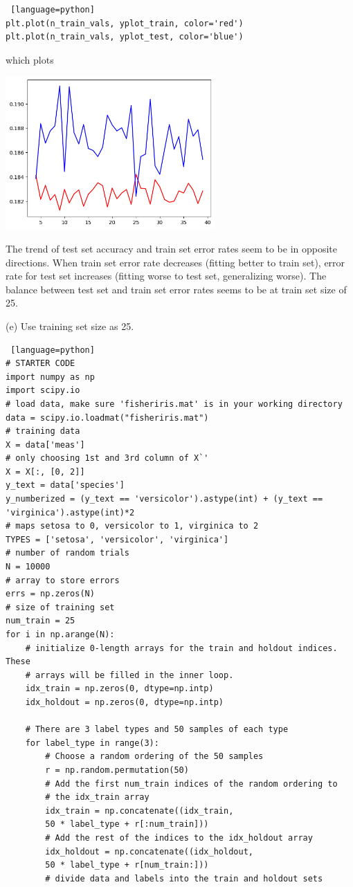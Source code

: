 \documentclass[a4paper, 12pt]{article}
\begin{document}
\begin{solution}
\begin{lstlisting} [language=python]
plt.plot(n_train_vals, yplot_train, color='red')
plt.plot(n_train_vals, yplot_test, color='blue')
\end{lstlisting} 
which plots 
\begin{center}
    \includegraphics[width=8cm]{./figures/3.3.png}
\end{center}
The trend of test set accuracy and train set error rates seem to be in opposite directions. When train set error rate decreases (fitting better to train set), error rate for test set increases (fitting worse to test set, generalizing worse). The balance between test set and train set error rates seems to be at train set size of 25.


(e)
Use training set size as 25.
\begin{lstlisting} [language=python]
# STARTER CODE
import numpy as np
import scipy.io
# load data, make sure 'fisheriris.mat' is in your working directory
data = scipy.io.loadmat("fisheriris.mat")
# training data
X = data['meas']
# only choosing 1st and 3rd column of X`'
X = X[:, [0, 2]]
y_text = data['species']
y_numberized = (y_text == 'versicolor').astype(int) + (y_text == 'virginica').astype(int)*2
# maps setosa to 0, versicolor to 1, virginica to 2
TYPES = ['setosa', 'versicolor', 'virginica']
# number of random trials
N = 10000
# array to store errors
errs = np.zeros(N)
# size of training set
num_train = 25
for i in np.arange(N):
    # initialize 0-length arrays for the train and holdout indices. These
    # arrays will be filled in the inner loop.
    idx_train = np.zeros(0, dtype=np.intp)
    idx_holdout = np.zeros(0, dtype=np.intp)

    # There are 3 label types and 50 samples of each type
    for label_type in range(3):
        # Choose a random ordering of the 50 samples
        r = np.random.permutation(50)
        # Add the first num_train indices of the random ordering to
        # the idx_train array
        idx_train = np.concatenate((idx_train,
        50 * label_type + r[:num_train]))
        # Add the rest of the indices to the idx_holdout array
        idx_holdout = np.concatenate((idx_holdout,
        50 * label_type + r[num_train:]))
        # divide data and labels into the train and holdout sets
    

\end{lstlisting}
\end{solution}
\end{document}
